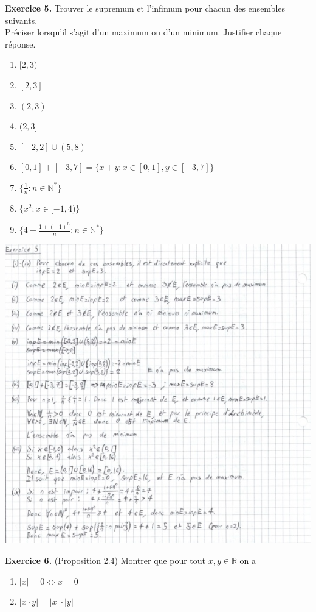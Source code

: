 \documentclass[a4paper, 10pt]{report}
\providecommand{\abs}[1]{\lvert#1\rvert}
\begin{document}
	\noindent
	\textbf{Exercice 5.} Trouver le supremum et l'infimum pour chacun des
	ensembles suivants.\\
	Préciser lorsqu'il s'agit d'un maximum ou d'un minimum.
	Justifier chaque réponse.
	\begin{enumerate}[label=(\roman*)]
		\item $[2, 3)$
		\item $[2, 3]$
		\item $(2, 3)$
		\item $(2, 3]$
		\item $[-2, 2] \cup (5, 8)$
		\item $[0,1] + [-3, 7] = \{x + y : x \in [0,1], y \in [-3,7]\}$
		\item $\{\frac{1}{n} : n \in \mathbb{N}^*\}$
		\item $\{x^2 : x \in [-1, 4)\}$
		\item $\{4 + \frac{1 + (-1)^n}{n} : n \in \mathbb{N}^*\}$
	\end{enumerate}
	
	\includegraphics{ex05.jpg}
	
	\newpage
	
	\noindent
	\textbf{Exercice 6.} (Proposition 2.4)
	Montrer que pour tout $x, y \in \mathbb{R}$ on a
	\begin{enumerate}[label=(\roman*)]
		\item $\abs{x} = 0 \iff x = 0$
		\item $\abs{x \cdot y} = \abs{x} \cdot \abs{y}$
	\end{enumerate}
	
\end{document}
